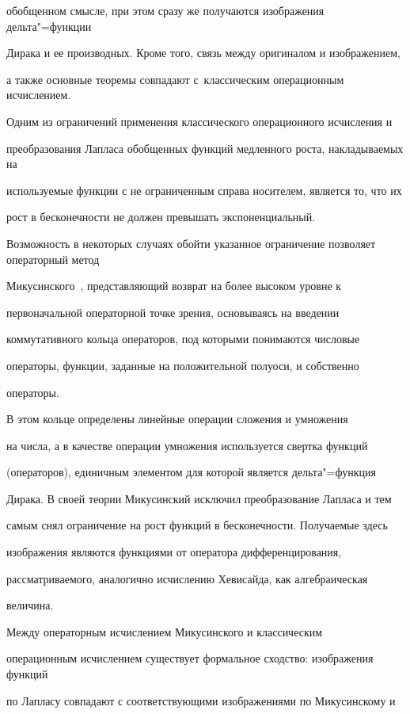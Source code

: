 обобщенном смысле, при этом сразу же получаются изображения дельта"=функции 

Дирака и ее производных. Кроме того, связь между оригиналом и изображением, 

а также основные теоремы совпадают с~классическим операционным исчислением. 



Одним из ограничений применения классического операционного исчисления и 

преобразования Лапласа обобщенных функций медленного роста, накладываемых на 

используемые функции с не ограниченным справа носителем, является то, что их 

рост в бесконечности не должен превышать экспоненциальный. 

Возможность  в  некоторых случаях обойти указанное ограничение позволяет операторный метод 

Микусинского~\cite{kogan:bib14}, представляющий возврат на более высоком уровне к 

первоначальной операторной точке зрения, основываясь на введении

коммутативного кольца операторов, под которыми понимаются числовые 

операторы, функции, заданные на положительной полуоси, и собственно 

операторы. 

В этом кольце определены линейные операции сложения и умножения 

на числа, а в качестве операции умножения используется свертка функций 

(операторов), единичным элементом для которой является дельта"=функция 

Дирака. В своей теории Микусинский исключил преобразование Лапласа и тем 

самым снял ограничение на рост функций в бесконечности. Получаемые здесь 

изображения являются функциями от оператора дифференцирования, 

рассматриваемого, аналогично исчислению Хевисайда, как алгебраическая 

величина. 

Между операторным исчислением Микусинского и классическим 

операционным исчислением существует формальное сходство: изображения функций 

по Лапласу совпадают с соответствующими изображениями по Микусинскому и 

